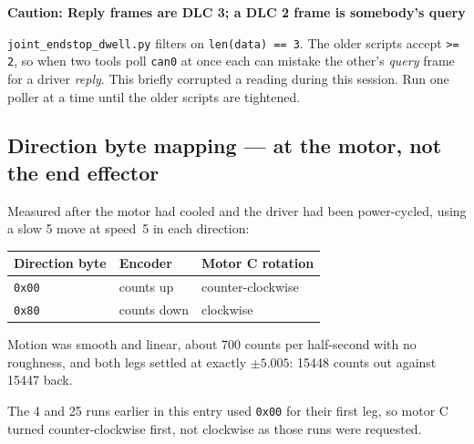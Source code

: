\documentclass[11pt,letterpaper]{article}
\newenvironment{caution}[1]{%
    \par\addvspace{8pt}%
    \noindent{\color{cautionred}\rule{\linewidth}{0.8pt}}\par\vspace{2pt}
    \noindent\textbf{\color{cautionred}Caution: #1}\par\vspace{2pt}
}{%
    \par\vspace{2pt}\noindent{\color{cautionred}\rule{\linewidth}{0.4pt}}%
    \par\addvspace{8pt}%
}
\begin{document}
\begin{caution}{Reply frames are DLC 3; a DLC 2 frame is somebody's query}
\texttt{joint\_endstop\_dwell.py} filters on \texttt{len(data) == 3}. The older
scripts accept \texttt{>= 2}, so when two tools poll \texttt{can0} at once each
can mistake the other's \emph{query} frame for a driver \emph{reply}. This
briefly corrupted a reading during this session. Run one poller at a time until
the older scripts are tightened.
\end{caution}

\subsection{Direction byte mapping --- at the motor, not the end effector}
Measured after the motor had cooled and the driver had been power-cycled, using a
slow 5\textdegree{} move at speed~5 in each direction:

\begin{center}
\begin{tabular}{lll}
\toprule
\textbf{Direction byte} & \textbf{Encoder} & \textbf{Motor C rotation} \\ \midrule
\texttt{0x00} & counts up   & counter-clockwise \\
\texttt{0x80} & counts down & clockwise \\
\bottomrule
\end{tabular}
\end{center}

Motion was smooth and linear, about 700 counts per half-second with no roughness,
and both legs settled at exactly $\pm5.005$\textdegree{}: 15448 counts out against
15447 back.

The 4\textdegree{} and 25\textdegree{} runs earlier in this entry used \texttt{0x00}
for their first leg, so motor C turned counter-clockwise first, not clockwise as
those runs were requested.
\end{document}
